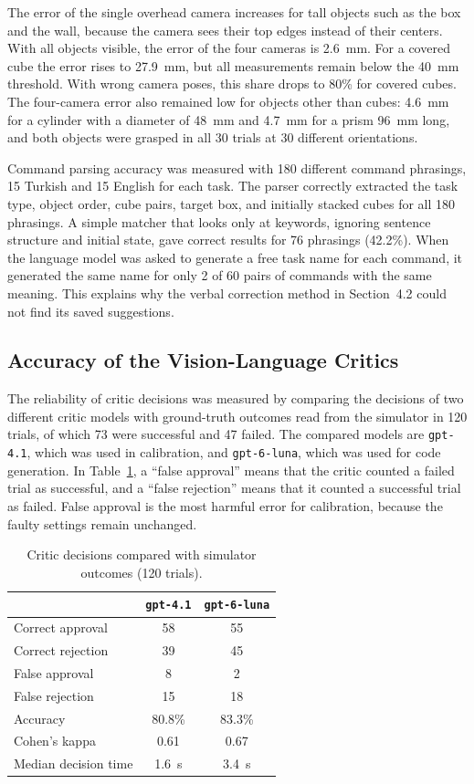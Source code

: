 \documentclass[preprint,12pt]{elsarticle}
\begin{document}
The error of the single overhead camera increases for tall objects such as the box and the wall, because the camera sees their top edges instead of their centers. With all objects visible, the error of the four cameras is 2.6~mm. For a covered cube the error rises to 27.9~mm, but all measurements remain below the 40~mm threshold. With wrong camera poses, this share drops to 80\% for covered cubes. The four-camera error also remained low for objects other than cubes: 4.6~mm for a cylinder with a diameter of 48~mm and 4.7~mm for a prism 96~mm long, and both objects were grasped in all 30 trials at 30 different orientations.

Command parsing accuracy was measured with 180 different command phrasings, 15 Turkish and 15 English for each task. The parser correctly extracted the task type, object order, cube pairs, target box, and initially stacked cubes for all 180 phrasings. A simple matcher that looks only at keywords, ignoring sentence structure and initial state, gave correct results for 76 phrasings (42.2\%). When the language model was asked to generate a free task name for each command, it generated the same name for only 2 of 60 pairs of commands with the same meaning. This explains why the verbal correction method in Section~4.2 could not find its saved suggestions.

\subsection{Accuracy of the Vision-Language Critics}

The reliability of critic decisions was measured by comparing the decisions of two different critic models with ground-truth outcomes read from the simulator in 120 trials, of which 73 were successful and 47 failed. The compared models are \texttt{gpt-4.1}, which was used in calibration, and \texttt{gpt-6-luna}, which was used for code generation. In Table~\ref{tab:critic}, a ``false approval'' means that the critic counted a failed trial as successful, and a ``false rejection'' means that it counted a successful trial as failed. False approval is the most harmful error for calibration, because the faulty settings remain unchanged.

\begin{table}[htbp]
\centering
\caption{Critic decisions compared with simulator outcomes (120 trials).}
\label{tab:critic}
\begin{tabular}{@{}l c c@{}}
\toprule
 & \texttt{gpt-4.1} & \texttt{gpt-6-luna} \\
\midrule
Correct approval & 58 & 55 \\
Correct rejection & 39 & 45 \\
False approval & 8 & 2 \\
False rejection & 15 & 18 \\
Accuracy & 80.8\% & 83.3\% \\
Cohen's kappa & 0.61 & 0.67 \\
Median decision time & 1.6~s & 3.4~s \\
\bottomrule
\end{tabular}
\end{table}
\end{document}
